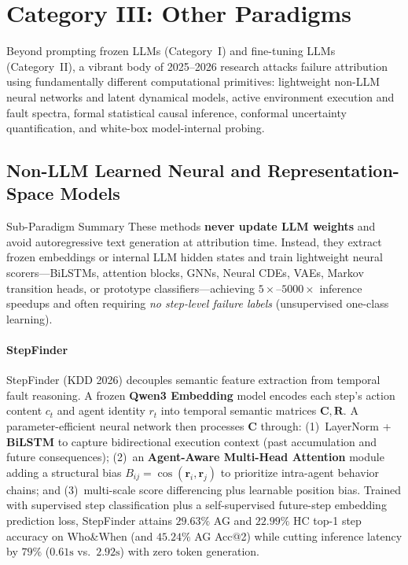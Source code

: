 \section{Category III: Other Paradigms}\label{sec:other}

Beyond prompting frozen LLMs (Category~I) and fine-tuning LLMs (Category~II), a vibrant body of 2025--2026 research attacks failure attribution using fundamentally different computational primitives: lightweight non-LLM neural networks and latent dynamical models, active environment execution and fault spectra, formal statistical causal inference, conformal uncertainty quantification, and white-box model-internal probing.

\subsection{Non-LLM Learned Neural and Representation-Space Models}\label{sec:nonllm}
\begin{summarybox}[s3]{Sub-Paradigm Summary \hfill \nonllmbadge}
These methods \textbf{never update LLM weights} and avoid autoregressive text generation at attribution time. Instead, they extract frozen embeddings or internal LLM hidden states and train lightweight neural scorers---BiLSTMs, attention blocks, GNNs, Neural CDEs, VAEs, Markov transition heads, or prototype classifiers---achieving $5\times$--$5000\times$ inference speedups and often requiring \emph{no step-level failure labels} (unsupervised one-class learning).
\end{summarybox}

\paragraph{StepFinder~\citep{zhu2026stepfinder}}
StepFinder (KDD 2026) decouples semantic feature extraction from temporal fault reasoning. A frozen \textbf{Qwen3 Embedding} model encodes each step's action content $c_t$ and agent identity $r_t$ into temporal semantic matrices $\mathbf{C}, \mathbf{R}$. A parameter-efficient neural network then processes $\mathbf{C}$ through: (1)~LayerNorm + \textbf{BiLSTM} to capture bidirectional execution context (past accumulation and future consequences); (2)~an \textbf{Agent-Aware Multi-Head Attention} module adding a structural bias $B_{ij} = \cos(\mathbf{r}_i, \mathbf{r}_j)$ to prioritize intra-agent behavior chains; and (3)~multi-scale score differencing plus learnable position bias. Trained with supervised step classification plus a self-supervised future-step embedding prediction loss, StepFinder attains $29.63\%$ AG and $22.99\%$ HC top-1 step accuracy on Who\&When (and $45.24\%$ AG Acc@2) while cutting inference latency by $79\%$ ($0.61\text{s}$ vs.\ $2.92\text{s}$) with zero token generation.

